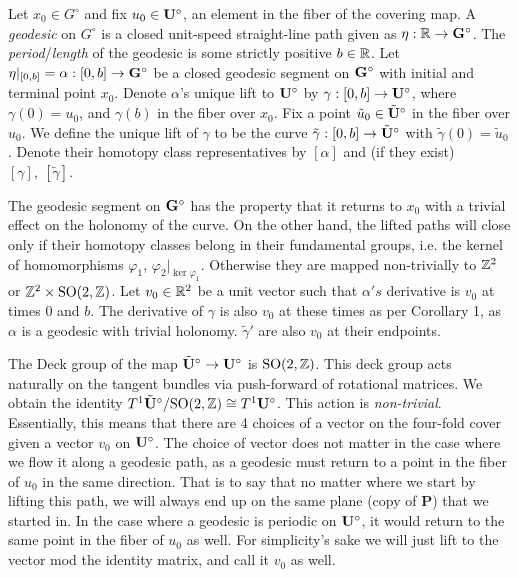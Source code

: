 \documentclass[]{article}
\def\btUs{\btU^\circ}
\def\utild{\tilde{u}_0}
\def\gamtild{\tilde{\gamma}}
\def\SO{\mathrm{SO}}
\begin{document}
Let $x_0\in G^\circ$ and fix $u_0\in\mathbf{U}^\circ$, an element in the fiber of the covering map. A \emph{geodesic} on $G^\circ$ is a closed unit-speed straight-line path given as $\eta:\mathbb{R}\rightarrow\mathbf{G}^\circ$. The \emph{period}/\emph{length} of the geodesic is some strictly positive $b\in\mathbb{R}$. Let $\eta|_{[0,b]}=\alpha:[0,b]\rightarrow\mathbf{G}^\circ$ be a closed geodesic segment on $\mathbf{G}^\circ$ with initial and terminal point $x_0$. Denote $\alpha$'s unique lift to $\mathbf{U}^\circ$ by $\gamma:[0,b]\rightarrow\mathbf{U}^\circ$, where $\gamma(0)=u_0$, and $\gamma(b)$ in the fiber over $x_0$. Fix a point $\utild\in\btUs$ in the fiber over $u_0$. We define the unique lift of $\gamma$ to be the curve $\tilde{\gamma}:[0,b]\rightarrow\btUs$ with $\tilde{\gamma}(0)=\utild$. Denote their homotopy class representatives by $[\alpha]$ and (if they exist) $[\gamma],~[\tilde{\gamma}]$.

The geodesic segment on $\mathbf{G}^\circ$ has the property that it returns to $x_0$ with a trivial effect on the holonomy of the curve. On the other hand, the lifted paths will close only if their homotopy classes belong in their fundamental groups, i.e. the kernel of homomorphisms $\varphi_1$, $\varphi_2|_{\ker\varphi_1}$. Otherwise they are mapped non-trivially to $\mathbb{Z}^2$ or $\ZZ^2\times\SO(2,\ZZ)$. Let $v_0\in\mathbb{R}^2$ be a unit vector such that $\alpha's$ derivative is $v_0$ at times $0$ and $b$. The derivative of $\gamma$ is also $v_0$ at these times as per Corollary 1, as $\alpha$ is a geodesic with trivial holonomy. $\gamtild'$ are also $v_0$ at their endpoints.

The Deck group of the map $\btUs\rightarrow\bUs$ is $\SO(2,\ZZ)$. This deck group acts naturally on the tangent bundles via push-forward of rotational matrices. We obtain the identity $T^1\btUs/\SO(2,\ZZ)\cong T^1\bUs$. This action is \emph{non-trivial}. Essentially, this means that there are 4 choices of a vector on the four-fold cover given a vector $v_0$ on $\mathbf{U}^\circ$. The choice of vector does not matter in the case where we flow it along a geodesic path, as a geodesic must return to a point in the fiber of $u_0$ in the same direction. That is to say that no matter where we start by lifting this path, we will always end up on the same plane (copy of $\mathbf{P}$) that we started in. In the case where a geodesic is periodic on $\mathbf{U}^\circ$, it would return to the same point in the fiber of $u_0$ as well. For simplicity's sake we will just lift to the vector mod the identity matrix, and call it $v_0$ as well.
\end{document}
